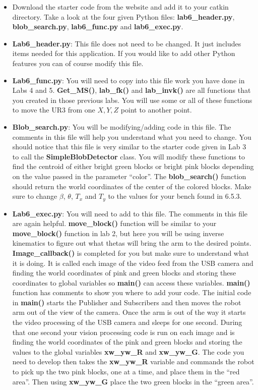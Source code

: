 \begin{itemize}

\item Download the starter code from the website and add it to your catkin directory. Take a look at the four given Python files: \textbf{lab6\_header.py}, \textbf{blob\_search.py}, \textbf{lab6\_func.py} and \textbf{lab6\_exec.py}. 

\item \textbf{Lab6\_header.py}:  This file does not need to be changed.  It just includes items needed for this application.  If you would like to add other Python features you can of course modify this file.

\item \textbf{Lab6\_func.py}:  You will need to copy into this file work you have done in Labs 4 and 5.  \textbf{Get\_MS()}, \textbf{lab\_fk()} and \textbf{lab\_invk()} are all functions that you created in those previous labs.  You will use some or all of these functions to move the UR3 from one $X,Y,Z$ point to another point.

\item \textbf{Blob\_search.py}:  You will be modifying/adding code in this file.  The comments in this file will help you understand what you need to change.  You should notice that this file is very similar to the starter code given in Lab 3 to call the \textbf{SimpleBlobDetector} class. You will modify these functions to find the centroid of either bright green blocks or bright pink blocks depending on the value passed in the parameter “color”.  The \textbf{blob\_search()} function should return the world coordinates of the center of the colored blocks.  Make sure to change $\beta$, $\theta$, $T_x$ and $T_y$ to the values for your bench found in 6.5.3. 

\item \textbf{Lab6\_exec.py}:  You will need to add to this file.  The comments in this file are again helpful. \textbf{move\_block()} function will be similar to your \textbf{move\_block()} function in lab 2, but here you will be using inverse kinematics to figure out what thetas will bring the arm to the desired points. \textbf{Image\_callback()} is completed for you but make sure to understand what it is doing.  It is called each image of the video feed from the USB camera and finding the world coordinates of pink and green blocks and storing these coordinates to global variables so \textbf{main()} can access these variables. \textbf{main()} function has comments to show you where to add your code.  The initial code in \textbf{main()} starts the Publisher and Subscribers and then moves the robot arm out of the view of the camera.  Once the arm is out of the way it starts the video processing of the USB camera and sleeps for one second.  During that one second your vision processing code is run on each image and is finding the world coordinates of the pink and green blocks and storing the values to the global variables \textbf{xw\_yw\_R} and \textbf{xw\_yw\_G}.  The code you need to develop then takes the \textbf{xw\_yw\_R} variable and commands the robot to pick up the two pink blocks, one at a time, and place them in the “red area”.  Then using \textbf{xw\_yw\_G} place the two green blocks in the “green area”.  


\end{itemize}
